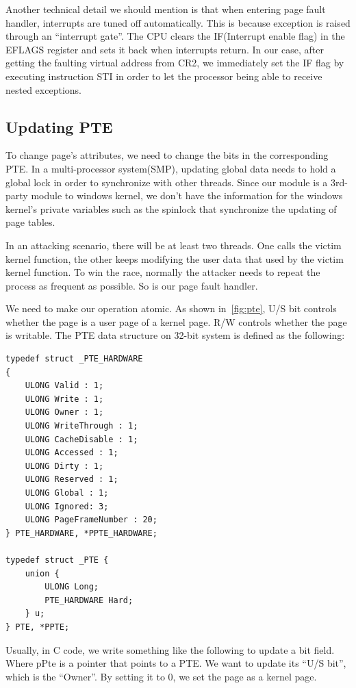 Another technical detail we should mention is that when entering page fault handler, interrupts are tuned off automatically. This is because exception is raised through an ``interrupt gate''. The CPU clears the IF(Interrupt enable flag) in the EFLAGS register and sets it back when interrupts return. In our case, after getting the faulting virtual address from CR2, we immediately set the IF flag by executing instruction STI in order to let the processor being able to receive nested exceptions.

\subsection{Updating PTE}

To change page's attributes, we need to change the bits in the corresponding PTE. In a multi-processor system(SMP), updating global data needs to hold a global lock in order to synchronize with other threads. Since our module is a 3rd-party module to windows kernel, we don't have the information for the windows kernel's private variables such as the spinlock that synchronize the updating of page tables. 

In an attacking scenario, there will be at least two threads. One calls the victim kernel function, the other keeps modifying the user data that used by the victim kernel function. To win the race, normally the attacker needs to repeat the process as frequent as possible. So is our page fault handler. 

We need to make our operation atomic. As shown in~\autoref{fig:pte}, U/S bit controls whether the page is a user page of a kernel page. R/W controls whether the page is writable. The PTE data structure on 32-bit system is defined as the following:

\begin{lstlisting}[style=code] 
typedef struct _PTE_HARDWARE
{
	ULONG Valid : 1;
	ULONG Write : 1;
	ULONG Owner : 1;
	ULONG WriteThrough : 1;
	ULONG CacheDisable : 1;
	ULONG Accessed : 1;
	ULONG Dirty : 1;
	ULONG Reserved : 1;
	ULONG Global : 1;
	ULONG Ignored: 3;
	ULONG PageFrameNumber : 20;
} PTE_HARDWARE, *PPTE_HARDWARE;

typedef struct _PTE {
	union {
		ULONG Long;
		PTE_HARDWARE Hard;
	} u;
} PTE, *PPTE;
\end{lstlisting}


Usually, in C code, we write something like the following to update a bit field. Where pPte is a pointer that points to a PTE. We want to update its ``U/S bit'', which is the ``Owner''. By setting it to 0, we set the page as a kernel page. 

